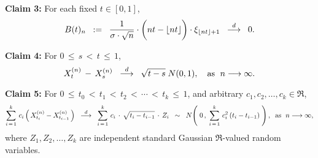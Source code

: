 \begin{enumerate}
		\vskip 0.5cm
		\begin{center}
		\begin{minipage}{6.0in}
		\noindent
		\textbf{Claim 3:}
		\quad For each fixed $t \in [0,1]$,
		\begin{equation*}
		B(t)_{n} \;\; := \;\;
		\dfrac{1}{\sigma\cdot\sqrt{n}}
		\cdot
		\left(\overset{{\color{white}1}}{nt} - \lfloor nt \rfloor\right)
		\cdot
		\xi_{\lfloor nt \rfloor + 1}
		\;\; \overset{d}{\longrightarrow} \;\;
		0.
		\end{equation*}
		\end{minipage}
		\end{center}

		\vskip 0.5cm
		\begin{center}
		\begin{minipage}{6.0in}
		\noindent
		\textbf{Claim 4:}\quad
		For $0 \,\leq\, s \,<\, t \,\leq\, 1$,
		\begin{equation*}
		X^{(n)}_{t} \,-\, X^{(n)}_{s}
		\;\; \overset{d}{\longrightarrow} \;\;
		\sqrt{t - s}\;N(0,1),
		\quad
		\textnormal{as \;$n \longrightarrow\infty$}.
		\end{equation*}
		\end{minipage}
		\end{center}

		\vskip 0.5cm
		\begin{center}
		\begin{minipage}{6.0in}
		\noindent
		\textbf{Claim 5:}\quad
		For $0 \,\leq\, t_{0} \,<\, t_{1} \,<\, t_{2} \,<\, \cdots \,<\, t_{k} \,\leq\, 1$,
		and arbitrary $c_{1}, c_{2}, \ldots, c_{k} \in \Re$,
		\begin{equation*}
		\sum_{i\,=\,1}^{k}\,c_{i}\left(\,X^{(n)}_{t_{i}} - X^{(n)}_{t_{i-1}}\,\right)
		\;\; \overset{d}{\longrightarrow} \;\;
		\sum_{i\,=\,1}^{k}\,c_{i} \,\cdot\, \sqrt{t_{i} - t_{i-1}} \,\cdot\, Z_{i}
		\;\; \sim \;\;
		N\!\left(\;0\,,\;\sum_{i\,=\,1}^{k}\,c_{i}^{2}\,(t_{i} - t_{i-1})\;\right),
		\;\;
		\textnormal{as \;$n \longrightarrow\infty$},
		\end{equation*}
		where $Z_{1}, Z_{2}, \ldots, Z_{k}$ are independent
		standard Gaussian $\Re$-valued random variables.
		\end{minipage}
		\end{center}


\end{enumerate}
